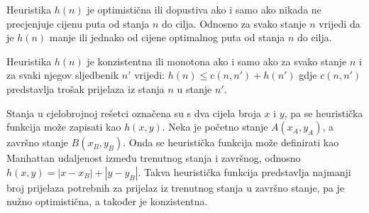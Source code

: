 Heuristika \( h(n) \) je optimistična ili dopustiva ako i samo ako nikada ne precjenjuje cijenu puta od stanja \( n \) do cilja. Odnosno za svako stanje \( n \) vrijedi da je \( h(n) \) manje ili jednako od cijene optimalnog puta od stanja \( n \) do cilja. \cite{umjetna}

Heuristika \( h(n) \) je konzistentna ili monotona ako i samo ako za svako stanje \( n \) i za svaki njegov sljedbenik \( n' \) vrijedi: \( h(n) \leq c(n, n') + h(n') \) gdje \( c(n, n') \) predstavlja trošak prijelaza iz stanja \( n \) u stanje \( n' \). \cite{russelNorvig2003:aima}

Stanja u cjelobrojnoj rešetci označena su s dva cijela broja \( x \) i \( y \), pa se heuristička funkcija može zapisati kao \( h(x, y) \).
Neka je početno stanje \( A(x_A, y_A) \), a završno stanje \( B(x_B, y_B) \).
Onda se heuristička funkcija može definirati kao Manhattan udaljenost između trenutnog stanja i završnog, odnosno \( h(x, y) = |x - x_B| + |y - y_B| \).
Takva heuristička funkcija predstavlja najmanji broj prijelaza potrebnih za prijelaz iz trenutnog stanja u završno stanje, pa je nužno optimistična, a također je konzistentna.

